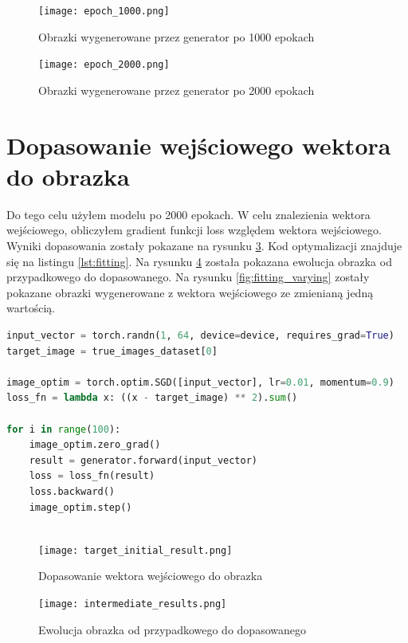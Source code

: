 \documentclass[a4paper]{article}
\begin{document}
\begin{figure}[H]
    \centering
    \texttt{[image: epoch\_1000.png]}
    \caption{Obrazki wygenerowane przez generator po 1000 epokach}
    \label{fig:1000}
\end{figure}

\begin{figure}[H]
    \centering
    \texttt{[image: epoch\_2000.png]}
    \caption{Obrazki wygenerowane przez generator po 2000 epokach}
    \label{fig:2000}
\end{figure}

\section{Dopasowanie wejściowego wektora do obrazka}

Do tego celu użyłem modelu po 2000 epokach. W celu znalezienia wektora
wejściowego, obliczyłem gradient funkcji loss względem wektora wejściowego.
Wyniki dopasowania zostały pokazane na rysunku \ref{fig:fitting}.
Kod optymalizacji znajduje się na listingu \ref{lst:fitting}. Na rysunku
\ref{fig:fitting_evolution} została pokazana ewolucja obrazka od przypadkowego
do dopasowanego. Na rysunku \ref{fig:fitting_varying} zostały pokazane obrazki
wygenerowane z wektora wejściowego ze zmienianą jedną wartością.



\begin{lstlisting}[language=python,caption={Dopasowanie wektora wejściowego do obrazka},label={lst:fitting}]
input_vector = torch.randn(1, 64, device=device, requires_grad=True)
target_image = true_images_dataset[0]

image_optim = torch.optim.SGD([input_vector], lr=0.01, momentum=0.9)
loss_fn = lambda x: ((x - target_image) ** 2).sum()

for i in range(100):
    image_optim.zero_grad()
    result = generator.forward(input_vector)
    loss = loss_fn(result)
    loss.backward()
    image_optim.step()
    
\end{lstlisting}

\begin{figure}[H]
    \centering
    \texttt{[image: target\_initial\_result.png]}
    \caption{Dopasowanie wektora wejściowego do obrazka}
    \label{fig:fitting}
\end{figure}

\begin{figure}[H]
    \centering
    \texttt{[image: intermediate\_results.png]}
    \caption{Ewolucja obrazka od przypadkowego do dopasowanego}
    \label{fig:fitting_evolution}
\end{figure}
\end{document}
